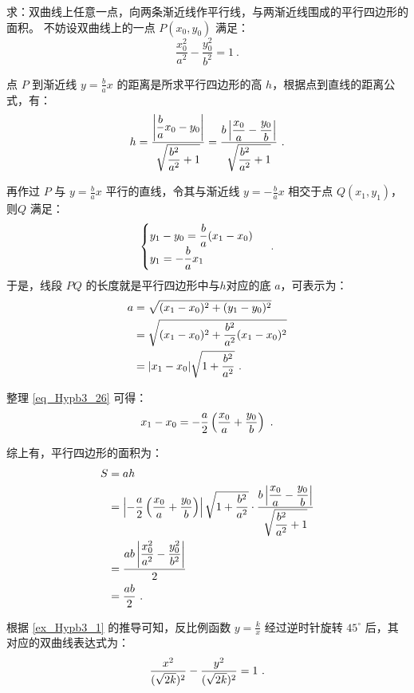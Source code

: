 \begin{example}{求：双曲线上任意一点，向两条渐近线作平行线，与两渐近线围成的平行四边形的面积。}
不妨设双曲线上的一点 $P(x_0, y_0)$ 满足：
\begin{equation}
\frac{x_0^2}{a^2}-\frac{y_0^2}{b^2}=1~.
\end{equation}

点 $P$ 到渐近线 $\displaystyle y = \frac{b}{a}x$ 的距离是所求平行四边形的高 $h$，根据点到直线的距离公式，有：
\begin{equation}
h=\frac{\left|\displaystyle{b\over a}x_0-y_0\right|}{\displaystyle\sqrt{{b^2\over a^2}+1}}=\frac{b\left|\displaystyle \displaystyle{x_0\over a}-{y_0\over b}\right|}{\displaystyle\sqrt{{b^2\over a^2}+1}}~.
\end{equation}

再作过 $P$ 与 $\displaystyle y = \frac{b}{a}x$ 平行的直线，令其与渐近线 $\displaystyle y = -\frac{b}{a}x$ 相交于点 $Q(x_1, y_1)$，则$Q$ 满足：
\begin{equation}\label{eq_Hypb3_26}
\begin{cases}
y_1-y_0=\displaystyle{b\over a}(x_1-x_0)\\
y_1=\displaystyle-{b\over a} x_1
\end{cases}~.
\end{equation}
于是，线段 $PQ$ 的长度就是平行四边形中与$h$对应的底 $a$，可表示为：
\begin{equation}
\begin{split}
a&=\sqrt{(x_1-x_0)^2+(y_1-y_0)^2}\\
&=\sqrt{(x_1-x_0)^2+{b^2\over a^2}(x_1-x_0)^2}\\
&=|x_1-x_0|\sqrt{1+{b^2\over a^2}}~.
\end{split}
\end{equation}

整理 \autoref{eq_Hypb3_26} 可得：
\begin{equation}
x_1-x_0=-\frac{a}{2}\left(\displaystyle{x_0\over a}+{y_0\over b}\right)~.
\end{equation}

综上有，平行四边形的面积为：
\begin{equation}\label{eq_Hypb3_27}
\begin{split}
S&=ah\\
&=\left|-\frac{a}{2}\left(\displaystyle{x_0\over a}+{y_0\over b}\right)\right|\sqrt{1+{b^2\over a^2}}\cdot\frac{b\left|\displaystyle \displaystyle{x_0\over a}-{y_0\over b}\right|}{\displaystyle\sqrt{{b^2\over a^2}+1}}\\
&=\frac{ab\left|\displaystyle\frac{x_0^2}{a^2}-\frac{y_0^2}{b^2}\right|}{2}\\
&=\frac{ab}{2}~.
\end{split}
\end{equation}
\end{example}
根据 \autoref{ex_Hypb3_1} 的推导可知，反比例函数 $\displaystyle y = \frac{k}{x}$ 经过逆时针旋转 $45^\circ$ 后，其对应的双曲线表达式为：
\begin{equation}
{x^2\over(\sqrt{2k})^2}- {y^2\over(\sqrt{2k})^2}=1~.
\end{equation}


